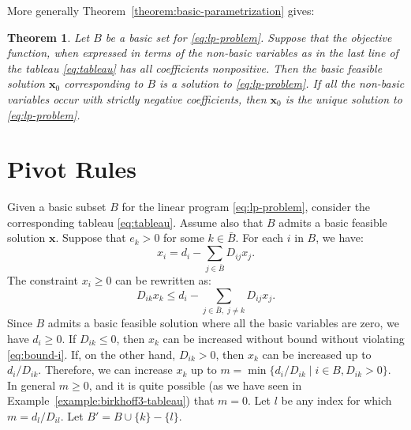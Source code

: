 \documentclass{amsbook}
\newcommand{\xx}{\mathbf x}
\newtheorem{theorem}{Theorem}[section]
\theoremstyle{definition}
\theoremstyle{remark}
\begin{document}
More generally Theorem~\ref{theorem:basic-parametrization} gives:
\begin{theorem}
  \label{theorem:pivot-basic}
  Let $B$ be a basic set for \eqref{eq:lp-problem}.
  Suppose that the objective function, when expressed in terms of the non-basic variables as in the last line of the tableau \eqref{eq:tableau} has all coefficients nonpositive.
  Then the basic feasible solution $\xx_0$ corresponding to $B$ is a solution to \eqref{eq:lp-problem}.
  If all the non-basic variables occur with strictly negative coefficients, then $\xx_0$ is the unique solution to \eqref{eq:lp-problem}.
\end{theorem}

\section{Pivot Rules}
\label{sec:pivot-rules}

Given a basic subset $B$ for the linear program \eqref{eq:lp-problem}, consider the corresponding tableau \eqref{eq:tableau}.
Assume also that $B$ admits a basic feasible solution $\xx$.
Suppose that $e_k>0$ for some $k\in \bar B$.
For each $i$ in $B$, we have:
\begin{equation}
  \label{eq:bound-i}
  x_i = d_i - \sum_{j\in \bar B} D_{ij}x_j.
\end{equation}
The constraint $x_i\geq 0$ can be rewritten as:
\begin{displaymath}
  D_{ik}x_k \leq d_i - \sum_{j\in \bar B,\;j\neq k} D_{ij}x_j.
\end{displaymath}
Since $B$ admits a basic feasible solution where all the basic variables are zero, we have $d_i\geq 0$.
If $D_{ik}\leq 0$, then $x_k$ can be increased without bound without violating \eqref{eq:bound-i}.
If, on the other hand, $D_{ik}>0$, then $x_k$ can be increased up to $d_i/D_{ik}$.
Therefore, we can increase $x_k$ up to $m=\min\{d_i/D_{ik}\mid i\in B, D_{ik}>0\}$.
In general $m\geq 0$, and it is quite possible (as we have seen in Example~\ref{example:birkhoff3-tableau}) that $m=0$.
Let $l$ be any index for which $m=d_l/D_{il}$.
Let $B'=B\cup\{k\}-\{l\}$.
\end{document}
